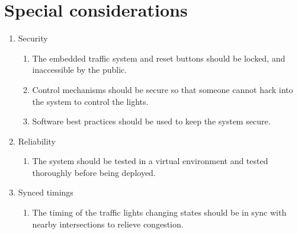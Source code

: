 \documentclass[letterpaper]{article}
\begin{document}
\section{Special considerations}

\begin{enumerate}
 \item Security\\
       \begin{enumerate}
        \item The embedded traffic system and reset buttons should be locked, and inaccessible by the public.
        \item Control mechanisms should be secure so that someone cannot hack into the system to control the lights.
        \item Software best practices should be used to keep the system secure.
       \end{enumerate}
 \item Reliability
       \begin{enumerate}
        \item The system should be tested in a virtual environment and tested thoroughly before being deployed.
       \end{enumerate}
 \item Synced timings
       \begin{enumerate}
        \item The timing of the traffic lights changing states should be in sync with nearby intersections
              to relieve congestion.
       \end{enumerate}
\end{enumerate}
\end{document}
